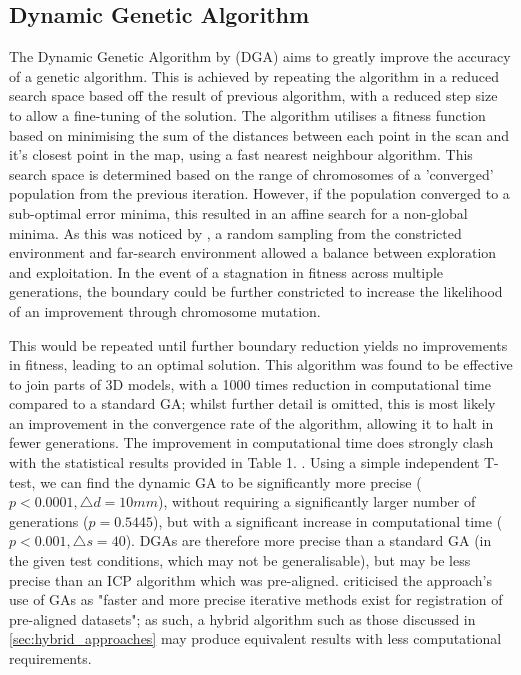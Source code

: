 \documentclass[authoryearcitations]{UoYCSproject}
\begin{document}
\subsection{Dynamic Genetic Algorithm}
The Dynamic Genetic Algorithm by \citet{Chow2004-xc} (DGA) aims to greatly improve the accuracy of a genetic algorithm. This is achieved by repeating the algorithm in a reduced search space based off the result of previous algorithm, with a reduced step size to allow a fine-tuning of the solution. The algorithm utilises a fitness function based on minimising the sum of the distances between each point in the scan and it's closest point in the map, using a fast nearest neighbour algorithm. This search space is determined based on the range of chromosomes of a 'converged' population from the previous iteration. However, if the population converged to a sub-optimal error minima, this resulted in an affine search for a non-global minima. As this was noticed by \citeauthor{Chow2004-xc}, a random sampling from the constricted environment and far-search environment allowed a balance between exploration and exploitation. In the event of a stagnation in fitness across multiple generations, the boundary could be further constricted to increase the likelihood of an improvement through chromosome mutation. 

This would be repeated until further boundary reduction yields no improvements in fitness, leading to an optimal solution. This algorithm was found to be effective to join parts of 3D models, with a 1000 times reduction in computational time compared to a standard GA; whilst further detail is omitted, this is most likely an improvement in the convergence rate of the algorithm, allowing it to halt in fewer generations. The improvement in computational time does strongly clash with the statistical results provided in Table 1. \cite{Chow2004-xc}. Using a simple independent T-test, we can find the dynamic GA to be significantly more precise ($p<0.0001, \triangle d = 10mm$), without requiring a significantly larger number of generations ($p=0.5445$), but with a significant increase in computational time ($p<0.001, \triangle s = 40$). DGAs are therefore more precise than a standard GA (in the given test conditions, which may not be generalisable), but may be less precise than an ICP algorithm which was pre-aligned. \citet{Lomonosov2006-vq} criticised the approach's use of GAs as "faster and more precise iterative methods exist for registration of pre-aligned datasets"; as such, a hybrid algorithm such as those discussed in \ref{sec:hybrid_approaches} may produce equivalent results with less computational requirements.
\end{document}
